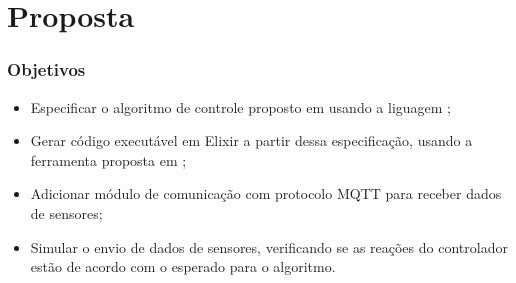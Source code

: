 \documentclass{beamer}
\begin{document}
\begin{frame}
\begin{minipage}{0.5\textwidth}
\begin{figure}
      \end{figure}
    \end{minipage}

  \end{frame}

  \section{Proposta}
  \begin{frame}
    \frametitle{Objetivos}

    \begin{itemize}
    \item Especificar o algoritmo de controle proposto em \cite{pumps} usando a liguagem \TLA;
    \item Gerar código executável em Elixir a partir dessa especificação, usando a
      ferramenta proposta em \cite{tcc};
    \item Adicionar módulo de comunicação com protocolo MQTT para receber dados de
      sensores;
    \item Simular o envio de dados de sensores, verificando se as reações do
      controlador estão de acordo com o esperado para o algoritmo.
    \end{itemize}
  \end{frame}
\end{document}
